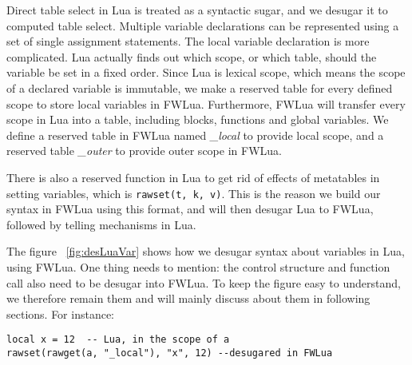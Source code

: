 Direct table select in Lua is treated as a syntactic sugar, and we desugar it to computed table select. 
Multiple variable declarations can be represented using a set of single assignment statements. 
The local variable declaration is more complicated. Lua actually finds out which scope, or which table, should the variable be set in a fixed order. Since Lua is lexical scope, which means the scope of a declared variable is immutable, we make a reserved table for every defined scope to store local variables in FWLua. Furthermore, FWLua will transfer every scope in Lua into a table, including blocks, functions and global variables. We define a reserved table in FWLua named {\it \_local} to provide local scope, and a reserved table {\it \_outer} to provide outer scope in FWLua.

There is also a reserved function in Lua to get rid of effects of metatables in setting variables, which is {\tt rawset(t, k, v)}. This is the reason we build our syntax in FWLua using this format, and will then desugar Lua to FWLua, followed by telling mechanisms in Lua.

The figure ~\ref{fig:desLuaVar} shows how we desugar syntax about variables in Lua, using FWLua. One thing needs to mention: the control structure and function call also need to be desugar into FWLua. To keep the figure easy to understand, we therefore remain them and will mainly discuss about them in following sections.
For instance:
\begin{verbatim}
local x = 12  -- Lua, in the scope of a
rawset(rawget(a, "_local"), "x", 12) --desugared in FWLua
\end{verbatim}

